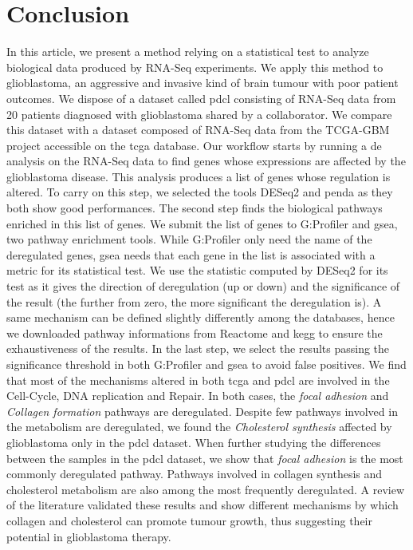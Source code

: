 \section{Conclusion}

In this article, we present a method relying on a statistical test to analyze biological data produced by RNA-Seq experiments.
We apply this method to glioblastoma, an aggressive and invasive kind of brain tumour with poor patient outcomes.
We dispose of a dataset called \acrshort{pdcl} consisting of RNA-Seq data from 20 patients diagnosed with glioblastoma shared by a collaborator.
We compare this dataset with a dataset composed of RNA-Seq data from the TCGA-GBM project accessible on the \acrshort{tcga} database.
Our workflow starts by running a \acrlong{de} analysis on the RNA-Seq data to find genes whose expressions are affected by the glioblastoma disease.
This analysis produces a list of genes whose regulation is altered.
To carry on this step, we selected the tools DESeq2 and \acrshort{penda} as they both show good performances.
The second step finds the biological pathways enriched in this list of genes.
We submit the list of genes to G:Profiler and \acrshort{gsea}, two pathway enrichment tools.
While G:Profiler only need the name of the deregulated genes, \acrshort{gsea} needs that each gene in the list is associated with a metric for its statistical test.
We use the statistic computed by DESeq2 for its test as it gives the direction of deregulation (up or down) and the significance of the result (the further from zero, the more significant the deregulation is).
A same mechanism can be defined slightly differently among the databases, hence we downloaded pathway informations from Reactome and \acrshort{kegg} to ensure the exhaustiveness of the results.
In the last step, we select the results passing the significance threshold in both G:Profiler and \acrshort{gsea} to avoid false positives.
We find that most of the mechanisms altered in both \acrshort{tcga} and \acrshort{pdcl} are involved in the Cell-Cycle, DNA replication and Repair.
In both cases, the \textit{focal adhesion} and \textit{Collagen formation} pathways are deregulated.
Despite few pathways involved in the metabolism are deregulated, we found the \textit{Cholesterol synthesis} affected by glioblastoma only in the \acrshort{pdcl} dataset.
When further studying the differences between the samples in the \acrshort{pdcl} dataset, we show that \textit{focal adhesion} is the most commonly deregulated pathway.
Pathways involved in collagen synthesis and cholesterol metabolism are also among the most frequently deregulated.
A review of the literature validated these results and show different mechanisms by which collagen and cholesterol can promote tumour growth, thus suggesting their potential in glioblastoma therapy.